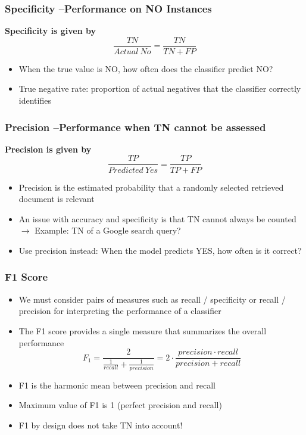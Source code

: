 \documentclass[conference]{styles/acmsiggraph}
\begin{document}
        \subsubsection{Specificity –Performance on NO Instances}
            \textbf{Specificity is given by} $$\frac{TN}{Actual\ No} = \frac{TN}{TN + FP}$$
            \begin{itemize}
                \item When the true value is NO, how often does the classifier predict NO?
                \item True negative rate: proportion of actual negatives that the classifier correctly identifies
            \end{itemize}

\newpage
        
        \subsubsection{Precision –Performance when TN cannot be assessed}
            \textbf{Precision is given by} $$\frac{TP}{Predicted\ Yes} = \frac{TP}{TP + FP}$$
            \begin{itemize}
                \item Precision is the estimated probability that a randomly selected retrieved document is relevant
                \item An issue with accuracy and specificity is that TN cannot always be counted\newline 
                $\rightarrow$ Example: TN of a Google search query?
                \item Use precision instead: When the model predicts YES, how often is it correct?
            \end{itemize}
        
        \subsubsection{F1 Score}
            \begin{itemize}
                \item We must consider pairs of measures such as recall / specificity or recall / precision for interpreting the performance of a classifier
                \item The F1 score provides a single measure that summarizes the overall performance
                $$F_1 = \frac{2}{\frac{1}{recall} + \frac{1}{precision}} = 2 \cdot \frac{precision \cdot recall}{precision + recall}$$
                \item F1 is the harmonic mean between precision and recall
                \item Maximum value of F1 is 1 (perfect precision and recall)
                \item F1 by design does not take TN into account!
            \end{itemize}
    
\end{document}
